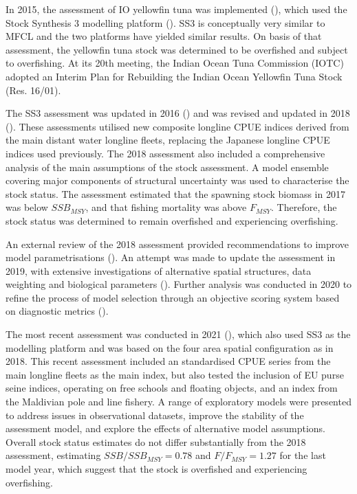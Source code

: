 \documentclass[
]{scrartcl}
\begin{document}
In 2015, the assessment of IO yellowfin tuna was implemented
(),
which used the Stock Synthesis 3 modelling platform
(). SS3 is conceptually very similar to MFCL and the two platforms
have yielded similar results. On basis of that assessment, the yellowfin
tuna stock was determined to be overfished and subject to overfishing.
At its 20th meeting, the Indian Ocean Tuna Commission (IOTC) adopted an
Interim Plan for Rebuilding the Indian Ocean Yellowfin Tuna Stock (Res.
16/01).

The SS3 assessment was updated in 2016
() and was
revised and updated in 2018
(). These
assessments utilised new composite longline CPUE indices derived from
the main distant water longline fleets, replacing the Japanese longline
CPUE indices used previously. The 2018 assessment also included a
comprehensive analysis of the main assumptions of the stock assessment.
A model ensemble covering major components of structural uncertainty was
used to characterise the stock status. The assessment estimated that the
spawning stock biomass in 2017 was below \(SSB_{MSY}\), and that fishing
mortality was above \(F_{MSY}\). Therefore, the stock status was
determined to remain overfished and experiencing overfishing.

An external review of the 2018 assessment provided recommendations to
improve model parametrisations
(). An attempt was made to update the assessment in 2019, with
extensive investigations of alternative spatial structures, data
weighting and biological parameters
(). Further analysis was conducted in 2020 to refine the process
of model selection through an objective scoring system based on
diagnostic metrics
().

The most recent assessment was conducted in 2021
(), which
also used SS3 as the modelling platform and was based on the four area
spatial configuration as in 2018. This recent assessment included an
standardised CPUE series from the main longline fleets as the main
index, but also tested the inclusion of EU purse seine indices,
operating on free schools and floating objects, and an index from the
Maldivian pole and line fishery. A range of exploratory models were
presented to address issues in observational datasets, improve the
stability of the assessment model, and explore the effects of
alternative model assumptions. Overall stock status estimates do not
differ substantially from the 2018 assessment, estimating
\(SSB/SSB_{MSY}=0.78\) and \(F/F_{MSY}=1.27\) for the last model year,
which suggest that the stock is overfished and experiencing overfishing.
\end{document}

